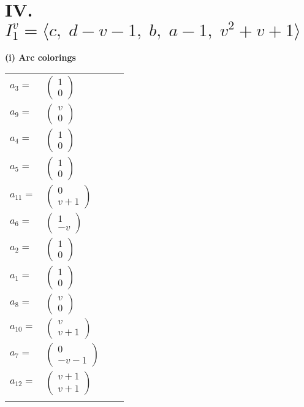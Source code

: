 \documentclass[1p]{elsarticle_modified}
\theoremstyle{definition}
\begin{document}
\centering \section*{IV. $I^v_{1}= \langle c,\;d- v-1,\;b,\;a-1,\;v^2+v+1 \rangle$}
\flushleft \textbf{(i) Arc colorings}\\
\begin{tabular}{m{7pt} m{180pt} m{7pt} m{180pt} }
\flushright $a_{3}=$&$\begin{pmatrix}1\\0\end{pmatrix}$ \\
\flushright $a_{9}=$&$\begin{pmatrix}v\\0\end{pmatrix}$ \\
\flushright $a_{4}=$&$\begin{pmatrix}1\\0\end{pmatrix}$ \\
\flushright $a_{5}=$&$\begin{pmatrix}1\\0\end{pmatrix}$ \\
\flushright $a_{11}=$&$\begin{pmatrix}0\\v+1\end{pmatrix}$ \\
\flushright $a_{6}=$&$\begin{pmatrix}1\\- v\end{pmatrix}$ \\
\flushright $a_{2}=$&$\begin{pmatrix}1\\0\end{pmatrix}$ \\
\flushright $a_{1}=$&$\begin{pmatrix}1\\0\end{pmatrix}$ \\
\flushright $a_{8}=$&$\begin{pmatrix}v\\0\end{pmatrix}$ \\
\flushright $a_{10}=$&$\begin{pmatrix}v\\v+1\end{pmatrix}$ \\
\flushright $a_{7}=$&$\begin{pmatrix}0\\- v-1\end{pmatrix}$ \\
\flushright $a_{12}=$&$\begin{pmatrix}v+1\\v+1\end{pmatrix}$\\&\end{tabular}
\end{document}
